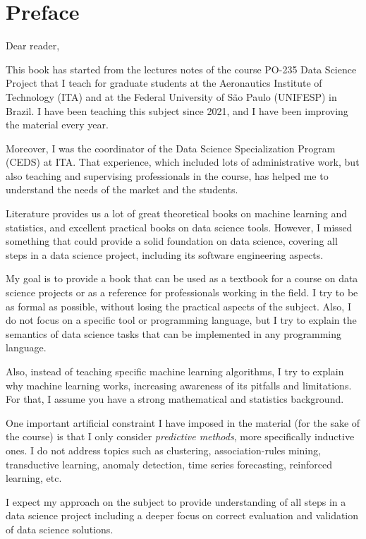 \chapter{Preface}

\noindent Dear reader, \vspace{1em}

This book has started from the lectures notes of the course PO-235 Data Science Project
that I teach for graduate students at the Aeronautics Institute of Technology (ITA) and at
the Federal University of São Paulo (UNIFESP) in Brazil.  I have been teaching this
subject since 2021, and I have been improving the
material every year.

Moreover, I was the coordinator of the Data Science Specialization Program (CEDS) at
ITA.  That experience, which included lots of administrative work, but also teaching and
supervising professionals in the course, has helped me to understand the needs of the
market and the students.

Literature provides us a lot of great theoretical books on machine learning and
statistics, and excellent practical books on data science tools.  However, I missed
something that could provide a solid foundation on data science, covering all steps in a
data science project, including its software engineering aspects.

My goal is to provide a book that can be used as a textbook for a course on data science
projects or as a reference for professionals working in the field.  I try to be as
formal as possible, without losing the practical aspects of the subject.  Also, I do not
focus on a specific tool or programming language, but I try to explain the semantics of
data science tasks that can be implemented in any programming language.

Also, instead of teaching specific machine learning algorithms, I try to explain why
machine learning works, increasing awareness of its pitfalls and limitations.
For that, I assume you have a strong mathematical and statistics background.

One important artificial constraint I have imposed in the material (for the sake of the
course) is that I only consider \emph{predictive methods}, more specifically inductive
ones.  I do not address topics such as clustering, association-rules mining, transductive
learning, anomaly detection, time series forecasting, reinforced learning, etc.

I expect my approach on the subject to provide understanding of all steps in a data science
project including a deeper focus on correct evaluation and validation of data science
solutions.

